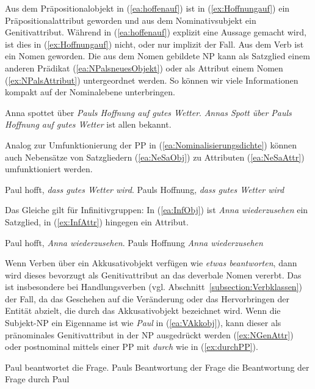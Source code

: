 Aus dem Präpositionalobjekt in (\ref{ea:hoffenauf}) ist in (\ref{ex:Hoffnungauf}) ein Präpositionalattribut geworden und aus dem Nominativsubjekt ein Genitivattribut.  Während in (\ref{ea:hoffenauf}) explizit eine Aussage gemacht wird, ist dies in (\ref{ex:Hoffnungauf}) nicht, oder nur implizit der Fall. Aus dem Verb ist ein Nomen geworden. Die aus dem Nomen gebildete NP kann als Satzglied einem anderen Prädikat (\ref{ea:NPalsneuesObjekt}) oder als Attribut einem Nomen (\ref{ex:NPalsAttribut}) untergeordnet werden. So können wir viele Informationen kompakt auf der Nominalebene unterbringen. 

\ea \label{ea:Nominalisierungsdichte}
\ea \label{ea:NPalsneuesObjekt} Anna spottet über \textit{Pauls Hoffnung auf gutes Wetter}.
\ex \label{ex:NPalsAttribut} \textit{Annas Spott über Pauls Hoffnung auf gutes Wetter} ist allen bekannt.
\z 
\z 

Analog zur Umfunktionierung der PP in (\ref{ea:Nominalisierungsdichte}) können auch Nebensätze von Satzgliedern (\ref{ea:NeSaObj}) zu Attributen (\ref{ea:NeSaAttr}) umfunktioniert werden. 

\ea \label{ea:NeSaAttrSG}
\ea \label{ea:NeSaObj} Paul hofft, \textit{dass gutes Wetter wird}.
\ex \label{ea:NeSaAttr} Pauls Hoffnung, \textit{dass gutes Wetter wird}
\z 
\z 

Das Gleiche gilt für Infinitivgruppen: In (\ref{ea:InfObj}) ist \textit{Anna wiederzusehen} ein Satzglied, in (\ref{ex:InfAttr}) hingegen ein Attribut.

\ea \label{ea:InfAttrSG}
\ea \label{ea:InfObj} Paul hofft, \textit{Anna wiederzusehen}.
\ex \label{ex:InfAttr} Pauls Hoffnung \textit{Anna wiederzusehen}
\z 
\z 


Wenn Verben über ein Akkusativobjekt verfügen wie \textit{etwas beantworten}, dann wird dieses bevorzugt als Genitivattribut an das deverbale Nomen vererbt. Das ist insbesondere bei Handlungsverben (vgl. Abschnitt~\ref{subsection:Verbklassen}) der Fall, da das Geschehen auf die Veränderung oder das Hervorbringen der Entität abzielt, die durch das Akkusativobjekt bezeichnet wird. Wenn die Subjekt-NP ein Eigenname ist wie \textit{Paul} in (\ref{ea:VAkkobj}), kann dieser als pränominales Genitivattribut in der NP ausgedrückt werden (\ref{ex:NGenAttr}) oder postnominal mittels einer PP mit \textit{durch} wie in (\ref{ex:durchPP}). 

\ea \label{ea:NominalisierungAkkObj}
\ea \label{ea:VAkkobj} Paul beantwortet die Frage.
\ex \label{ex:NGenAttr} Pauls Beantwortung der Frage
\ex \label{ex:durchPP} die Beantwortung der Frage durch Paul
\z 
\z 

